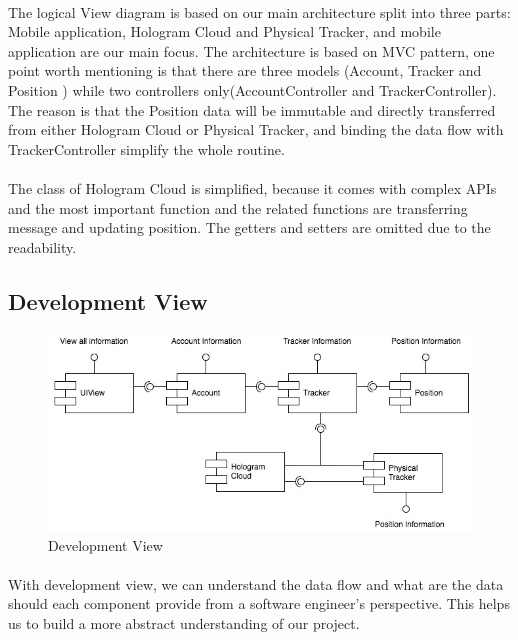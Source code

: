 \documentclass[12pt,a4paper]{article}
\begin{document}
        \paragraph{}
          The logical View diagram is based on our main architecture split into three parts: Mobile application, Hologram Cloud and Physical Tracker, and mobile application are our main focus. The architecture is based on MVC pattern, one point worth mentioning is that there are three models (Account, Tracker and Position ) while two controllers only(AccountController and TrackerController). The reason is that the Position data will be immutable and directly transferred from either Hologram Cloud or Physical Tracker, and binding the data flow with TrackerController simplify the whole routine.
        \paragraph{}
          The class of Hologram Cloud is simplified, because it comes with complex APIs and the most important function and the related functions are transferring message and updating position. The getters and setters are omitted due to the readability.
      
      \subsection{Development View}
        \begin{figure}[H]
          \centering
          \includegraphics[width=1\textwidth]{assets/7-technical-architecture-development.jpg}
          \caption{Development View}
          \label{fig:Development View}
        \end{figure}
        \paragraph{}
         With development view, we can understand the data flow and what are the data should each component provide from a software engineer's perspective. This helps us to build a more abstract understanding of our project.
\end{document}
